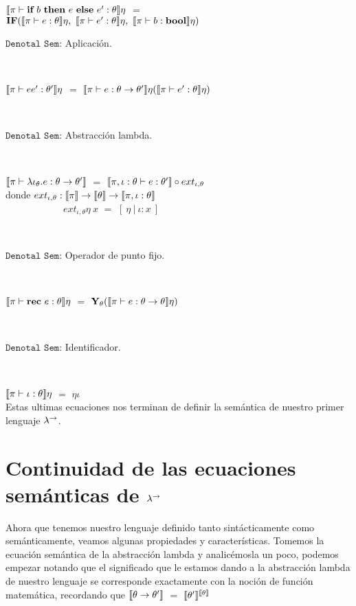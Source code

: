 $\llbracket \pi \vdash \textbf{if} \ b \ \textbf{then} \ e \ \textbf{else} \ e' : \theta \rrbracket\eta$ $=$ \\
\indent \indent \indent \indent \indent \indent \indent 
$\textbf{IF} (\llbracket \pi \vdash e : \theta \rrbracket\eta
	 , \ \llbracket \pi \vdash e' : \theta \rrbracket\eta
	 , \ \llbracket \pi \vdash b : \textbf{bool} \rrbracket\eta
	 )$

\newpage

\noindent
$\texttt{Denotal Sem:}$ Aplicaci\'on.\

\

$\llbracket \pi \vdash ee' : \theta' \rrbracket\eta$ $=$ $\llbracket \pi \vdash e : \theta \rightarrow \theta' \rrbracket\eta
														  (\llbracket \pi \vdash e' : \theta \rrbracket\eta)$

\

\noindent
$\texttt{Denotal Sem:}$ Abstracci\'on lambda.\

\

$\llbracket \pi \vdash \lambda \iota_{\theta} . e : \theta \rightarrow \theta' \rrbracket$ $=$
		$\llbracket \pi,\iota:\theta \vdash e : \theta' \rrbracket \circ ext_{\iota,\theta}$\\

donde 
$ext_{\iota,\theta} : \llbracket \pi \rrbracket 
					  \rightarrow \llbracket \theta \rrbracket \rightarrow \llbracket \pi,\iota:\theta \rrbracket$\\
\indent \ \ \ \ \ \ \ \ \ \ \ \
$ext_{\iota,\theta} \eta \ x$ $=$ $[\ \eta \ | \ \iota:x \ ]$

\

\noindent
$\texttt{Denotal Sem:}$ Operador de punto fijo.\

\

$\llbracket \pi \vdash \textbf{rec} \ e : \theta \rrbracket\eta$ $=$ $\textbf{Y}_{\theta} (\llbracket \pi \vdash e : \theta \rightarrow \theta \rrbracket\eta)$

\

\noindent
$\texttt{Denotal Sem:}$ Identificador.\

\

$\llbracket \pi \vdash \iota : \theta \rrbracket\eta$ $=$ $\eta \iota$\\

Estas ultimas ecuaciones nos terminan de definir la sem\'antica de nuestro 
primer lenguaje $\lambda^{\rightarrow}$.

\section{Continuidad de las ecuaciones sem\'anticas de $\lambda^{\rightarrow}$}

Ahora que tenemos nuestro lenguaje definido tanto sint\'acticamente como
sem\'anticamente, veamos algunas propiedades y caracter\'isticas. Tomemos
la ecuaci\'on sem\'antica de la abstracci\'on lambda y analic\'emosla un 
poco, podemos empezar notando que el significado que le estamos dando
a la abstracci\'on lambda de nuestro lenguaje se corresponde exactamente
con la noci\'on de funci\'on matem\'atica, recordando que 
$\llbracket \theta \rightarrow \theta' \rrbracket$ $=$ $\llbracket \theta' \rrbracket^{\llbracket \theta \rrbracket}$\\

